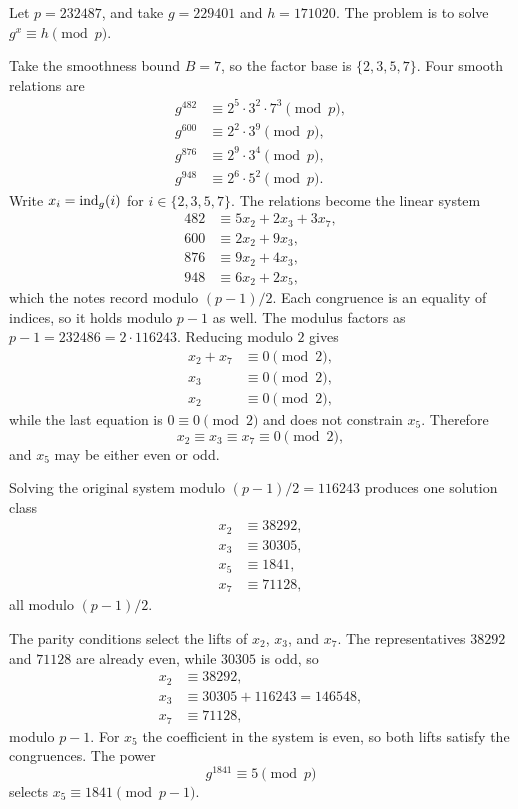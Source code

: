 \begin{example}
\label{ex:index}
Let \(p=232487\), and take \(g=229401\) and \(h=171020\). The problem is
to solve \(g^{x}\equiv h\pmod{p}\).

Take the smoothness bound \(B=7\), so the factor base is
\(\{2,3,5,7\}\). Four smooth relations are
\begin{align*}
    g^{482}&\equiv 2^{5}\cdot 3^{2}\cdot 7^{3}\pmod{p},\\
    g^{600}&\equiv 2^{2}\cdot 3^{9}\pmod{p},\\
    g^{876}&\equiv 2^{9}\cdot 3^{4}\pmod{p},\\
    g^{948}&\equiv 2^{6}\cdot 5^{2}\pmod{p}.
\end{align*}
Write \(x_{i}=\operatorname{ind}_{g}(i)\) for \(i\in\{2,3,5,7\}\). The relations become
the linear system
\begin{align*}
    482&\equiv 5x_{2}+2x_{3}+3x_{7},\\
    600&\equiv 2x_{2}+9x_{3},\\
    876&\equiv 9x_{2}+4x_{3},\\
    948&\equiv 6x_{2}+2x_{5},
\end{align*}
which the notes record modulo \((p-1)/2\). Each congruence is an equality
of indices, so it holds modulo \(p-1\) as well. The modulus factors as
\(p-1=232486=2\cdot 116243\). Reducing modulo \(2\) gives
\begin{align*}
    x_{2}+x_{7}&\equiv 0\pmod{2},\\
    x_{3}&\equiv 0\pmod{2},\\
    x_{2}&\equiv 0\pmod{2},
\end{align*}
while the last equation is \(0\equiv 0\pmod{2}\) and does not constrain
\(x_{5}\). Therefore
\[
    x_{2}\equiv x_{3}\equiv x_{7}\equiv 0\pmod{2},
\]
and \(x_{5}\) may be either even or odd.

Solving the original system modulo \((p-1)/2=116243\) produces one
solution class
\begin{align*}
    x_{2}&\equiv 38292,\\
    x_{3}&\equiv 30305,\\
    x_{5}&\equiv 1841,\\
    x_{7}&\equiv 71128,
\end{align*}
all modulo \((p-1)/2\).

The parity conditions select the lifts of \(x_{2}\), \(x_{3}\), and
\(x_{7}\). The representatives \(38292\) and \(71128\) are already even,
while \(30305\) is odd, so
\begin{align*}
    x_{2}&\equiv 38292,\\
    x_{3}&\equiv 30305+116243=146548,\\
    x_{7}&\equiv 71128,
\end{align*}
modulo \(p-1\). For \(x_{5}\) the coefficient in the system is even, so
both lifts satisfy the congruences. The power
\[
    g^{1841}\equiv 5\pmod{p}
\]
selects \(x_{5}\equiv 1841\pmod{p-1}\).


\end{example}
